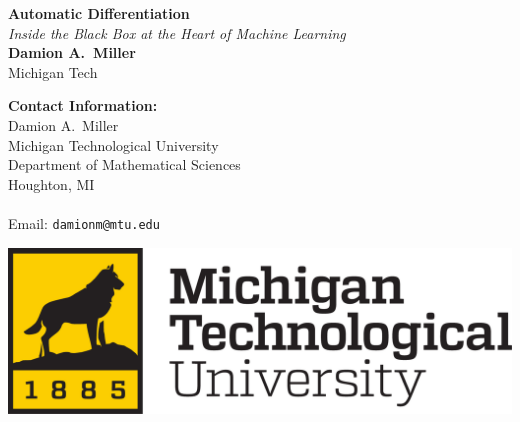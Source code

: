 \documentclass[a0,landscape]{a0poster}
\begin{document}


\begin{minipage}[b]{0.58\linewidth}
  \veryHuge \color{NavyBlue} \textbf{Automatic Differentiation} \color{Black}\\ %
  \Huge\textit{Inside the Black Box at the Heart of Machine Learning}\\[1cm] %
  \huge \textbf{Damion A.~Miller}\\ %
  \huge Michigan Tech\\ %
\end{minipage}
%
\begin{minipage}[b]{0.22\linewidth}
  \Large \textbf{Contact Information:}\\
  Damion A.~Miller\\
  Michigan Technological University\\
  Department of Mathematical Sciences \\
  Houghton, MI\\\\
  Email: \texttt{damionm@mtu.edu}\\ %
\end{minipage}
%
\begin{minipage}[b]{0.19\linewidth}
  \includegraphics[width=20cm]{figures/logo.png} %
  \vspace*{2in}
\end{minipage}
\end{document}

